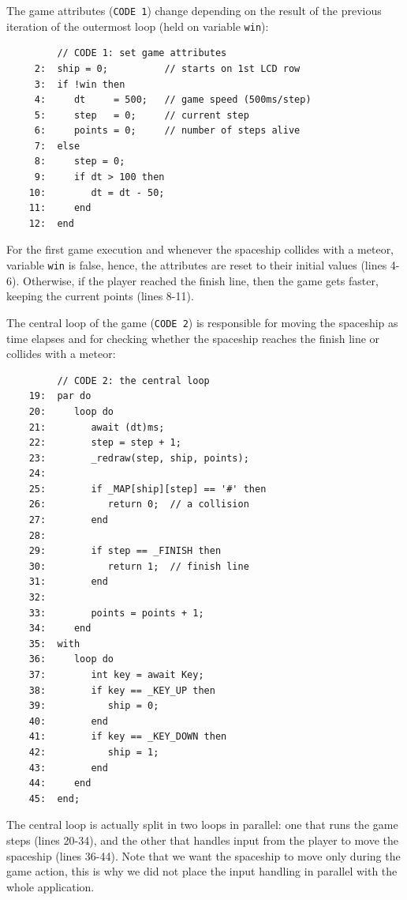 \documentclass{sig-alternate}
\newcommand{\2}{\;\;}
\newcommand{\5}{\;\;\;\;\;}
\newcommand{\code}[1] {{\small{\texttt{#1}}}}
\begin{document}
The game attributes (\code{CODE 1}) change depending on the result of the 
previous iteration of the outermost loop (held on variable \code{win}):

{\small
\begin{verbatim}
         // CODE 1: set game attributes
     2:  ship = 0;          // starts on 1st LCD row
     3:  if !win then
     4:     dt     = 500;   // game speed (500ms/step)
     5:     step   = 0;     // current step
     6:     points = 0;     // number of steps alive
     7:  else
     8:     step = 0;
     9:     if dt > 100 then
    10:        dt = dt - 50;
    11:     end
    12:  end
\end{verbatim}
}

For the first game execution and whenever the spaceship collides with a meteor, 
variable \code{win} is false, hence, the attributes are reset to their initial 
values (lines 4-6).
Otherwise, if the player reached the finish line, then the game gets faster, 
keeping the current points (lines 8-11).

The central loop of the game (\code{CODE 2}) is responsible for moving the 
spaceship as time elapses and for checking whether the spaceship reaches the 
finish line or collides with a meteor:

{\small
\begin{verbatim}
         // CODE 2: the central loop
    19:  par do
    20:     loop do
    21:        await (dt)ms;
    22:        step = step + 1;
    23:        _redraw(step, ship, points);
    24:
    25:        if _MAP[ship][step] == '#' then
    26:           return 0;  // a collision
    27:        end
    28:
    29:        if step == _FINISH then
    30:           return 1;  // finish line
    31:        end
    32:
    33:        points = points + 1;
    34:     end
    35:  with
    36:     loop do
    37:        int key = await Key;
    38:        if key == _KEY_UP then
    39:           ship = 0;
    40:        end
    41:        if key == _KEY_DOWN then
    42:           ship = 1;
    43:        end
    44:     end
    45:  end;
\end{verbatim}
}

The central loop is actually split in two loops in parallel: one that runs the 
game steps (lines 20-34), and the other that handles input from the player to 
move the spaceship (lines 36-44).
Note that we want the spaceship to move only during the game action, this is 
why we did not place the input handling in parallel with the whole application.
\end{document}
